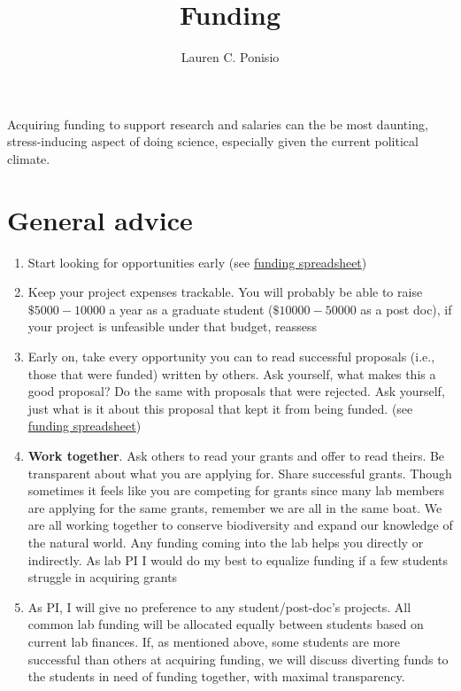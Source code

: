\documentclass[12pt]{article}
\title{Funding}
\author{Lauren C. Ponisio}
\begin{document}
\maketitle

Acquiring funding to support research and salaries can the be most
daunting, stress-inducing aspect of doing science, especially given
the current political climate.

\section{General advice}

\begin{enumerate}
\item Start looking for opportunities early (see 
  \href{https://docs.google.com/spreadsheets/d/1X2Dyz4HW13hsTmNoUvSoMYOmyobVVtfoGtEtdS0LQtI/edit?usp=sharing}{funding
    spreadsheet}) 
\item Keep your project expenses trackable. You will probably be able
  to raise $\$5000-10000$ a year as a graduate student
  ($\$10000-50000$ as a post doc), if your project is unfeasible under
  that budget, reassess
\item Early on, take every opportunity you can to read successful
  proposals (i.e., those that were funded) written by others. Ask
  yourself, what makes this a good proposal? Do the same with
  proposals that were rejected. Ask yourself, just what is it about
  this proposal that kept it from being funded.  (see 
  \href{https://docs.google.com/spreadsheets/d/1X2Dyz4HW13hsTmNoUvSoMYOmyobVVtfoGtEtdS0LQtI/edit?usp=sharing}{funding
    spreadsheet}) 
\item \textbf{Work together}. Ask others to read your grants and offer
  to read theirs. Be transparent about what you are applying
  for. Share successful grants. Though sometimes it feels like you are
  competing for grants since many lab members are applying for the
  same grants, remember we are all in the same boat. We are all
  working together to conserve biodiversity and expand our knowledge
  of the natural world. Any funding coming into the lab helps you
  directly or indirectly. As lab PI I would do my best to equalize
  funding if a few students struggle in acquiring grants
\item As PI, I will give no preference to any student/post-doc's
  projects. All common lab funding will be allocated equally between
  students based on current lab finances. If, as mentioned above, some
  students are more successful than others at acquiring funding, we will
  discuss diverting funds to the students in need of funding
  together, with maximal transparency. 
\end{enumerate}
\end{document}
